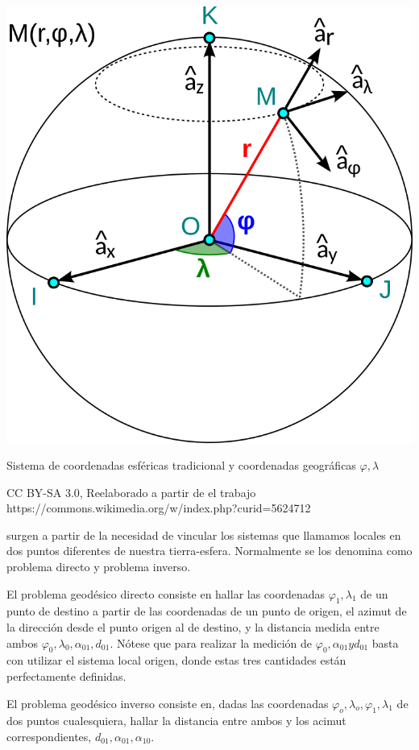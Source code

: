 \documentclass{tufte-book}
\begin{document}
\begin{marginfigure}
  \includegraphics{./imgs/latlon.png}
  \caption{Sistema de coordenadas esféricas tradicional y coordenadas geográficas \(\varphi,\lambda\)}
  \scriptsize  CC BY-SA 3.0, Reelaborado a partir de el trabajo https://commons.wikimedia.org/w/index.php?curid=5624712

\end{marginfigure}
 

 surgen a partir de la necesidad de vincular los sistemas que
llamamos locales en dos puntos diferentes de nuestra tierra-esfera. Normalmente se los denomina
como problema directo y problema inverso.

El problema geodésico directo consiste en hallar las coordenadas \(\varphi_1,\lambda_1\) de un punto
de destino a partir de las coordenadas de un punto de origen, el azimut de la dirección desde el
punto origen al de destino, y la distancia medida entre ambos \(\varphi_0, \lambda_0, \alpha_{01}, d_{01} \).
Nótese que para realizar la medición de \(\varphi_0, \alpha_{01} y d_{01}\) basta con utilizar
el sistema local origen, donde estas tres cantidades están perfectamente definidas.

El problema geodésico inverso consiste en, dadas las coordenadas \(\varphi_o,\lambda_o,\varphi_1,\lambda_1\)
de dos puntos cualesquiera, hallar la distancia entre ambos y los acimut correspondientes,
\(d_{01},\alpha_{01},\alpha_{10}\).
\end{document}
